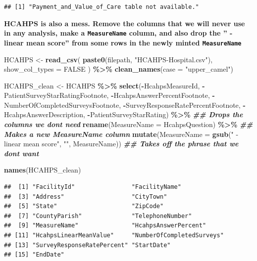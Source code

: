 \documentclass[
]{article}
\newenvironment{Shaded}{\begin{snugshade}}{\end{snugshade}}
\newcommand{\AttributeTok}[1]{\textcolor[rgb]{0.13,0.29,0.53}{#1}}
\newcommand{\ConstantTok}[1]{\textcolor[rgb]{0.56,0.35,0.01}{#1}}
\newcommand{\DocumentationTok}[1]{\textcolor[rgb]{0.56,0.35,0.01}{\textbf{\textit{#1}}}}
\newcommand{\FunctionTok}[1]{\textcolor[rgb]{0.13,0.29,0.53}{\textbf{#1}}}
\newcommand{\NormalTok}[1]{#1}
\newcommand{\OtherTok}[1]{\textcolor[rgb]{0.56,0.35,0.01}{#1}}
\newcommand{\SpecialCharTok}[1]{\textcolor[rgb]{0.81,0.36,0.00}{\textbf{#1}}}
\newcommand{\StringTok}[1]{\textcolor[rgb]{0.31,0.60,0.02}{#1}}
\begin{document}
\begin{verbatim}
## [1] "Payment_and_Value_of_Care table not available."
\end{verbatim}

\textbf{HCAHPS is also a mess. Remove the columns that we will never use
in any analysis, make a \texttt{MeasureName} column, and also drop the
'' - linear mean score'' from some rows in the newly minted
\texttt{MeasureName}}

\begin{Shaded}
\begin{Highlighting}[]
\NormalTok{HCAHPS }\OtherTok{\textless{}{-}} \FunctionTok{read\_csv}\NormalTok{(}
    \FunctionTok{paste0}\NormalTok{(filepath, }\StringTok{"HCAHPS{-}Hospital.csv"}\NormalTok{),}
    \AttributeTok{show\_col\_types =} \ConstantTok{FALSE}
\NormalTok{) }\SpecialCharTok{\%\textgreater{}\%}
    \FunctionTok{clean\_names}\NormalTok{(}\AttributeTok{case =} \StringTok{"upper\_camel"}\NormalTok{)}

\NormalTok{HCAHPS\_clean }\OtherTok{\textless{}{-}}\NormalTok{ HCAHPS }\SpecialCharTok{\%\textgreater{}\%} 
  \FunctionTok{select}\NormalTok{(}\SpecialCharTok{{-}}\NormalTok{HcahpsMeasureId, }\SpecialCharTok{{-}}\NormalTok{PatientSurveyStarRatingFootnote, }
         \SpecialCharTok{{-}}\NormalTok{HcahpsAnswerPercentFootnote, }\SpecialCharTok{{-}}\NormalTok{NumberOfCompletedSurveysFootnote,}
         \SpecialCharTok{{-}}\NormalTok{SurveyResponseRatePercentFootnote, }\SpecialCharTok{{-}}\NormalTok{HcahpsAnswerDescription,}
         \SpecialCharTok{{-}}\NormalTok{PatientSurveyStarRating) }\SpecialCharTok{\%\textgreater{}\%}  \DocumentationTok{\#\# Drops the columns we don\textquotesingle{}t need}
  \FunctionTok{rename}\NormalTok{(}\AttributeTok{MeasureName =}\NormalTok{ HcahpsQuestion) }\SpecialCharTok{\%\textgreater{}\%}  \DocumentationTok{\#\# Makes a new MeasureName column}
  \FunctionTok{mutate}\NormalTok{(}\AttributeTok{MeasureName =} \FunctionTok{gsub}\NormalTok{(}\StringTok{" {-} linear mean score"}\NormalTok{, }\StringTok{""}\NormalTok{, MeasureName))}
\DocumentationTok{\#\# Takes off the phrase that we don\textquotesingle{}t want}

\FunctionTok{names}\NormalTok{(HCAHPS\_clean)}
\end{Highlighting}
\end{Shaded}

\begin{verbatim}
##  [1] "FacilityId"                "FacilityName"             
##  [3] "Address"                   "CityTown"                 
##  [5] "State"                     "ZipCode"                  
##  [7] "CountyParish"              "TelephoneNumber"          
##  [9] "MeasureName"               "HcahpsAnswerPercent"      
## [11] "HcahpsLinearMeanValue"     "NumberOfCompletedSurveys" 
## [13] "SurveyResponseRatePercent" "StartDate"                
## [15] "EndDate"
\end{verbatim}
\end{document}
